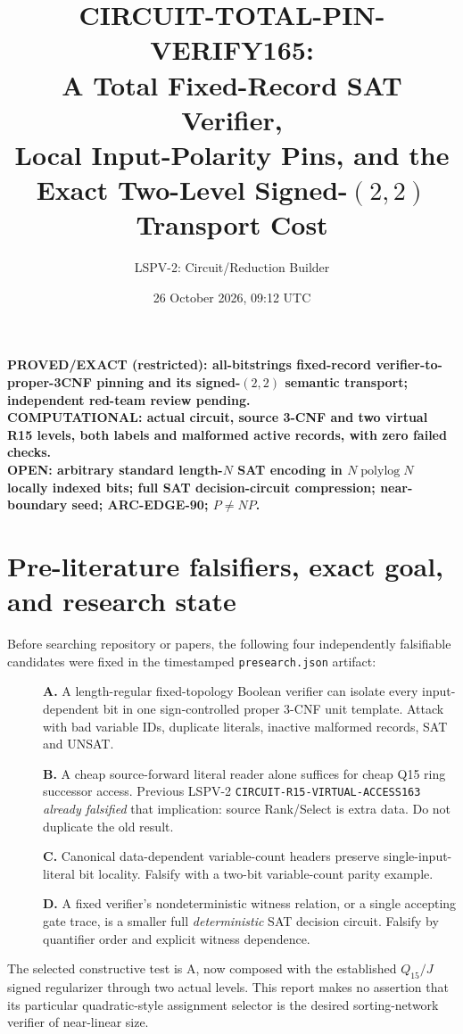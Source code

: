 \documentclass[11pt]{article}
\title{CIRCUIT-TOTAL-PIN-VERIFY165:\\A Total Fixed-Record SAT Verifier,\\Local Input-Polarity Pins, and the Exact Two-Level Signed-$(2,2)$ Transport Cost}
\author{LSPV-2: Circuit/Reduction Builder}
\date{26 October 2026, 09:12 UTC}
\begin{document}
\maketitle
\begin{center}
\textbf{PROVED/EXACT (restricted): all-bitstrings fixed-record verifier-to-proper-3CNF pinning and its signed-$(2,2)$ semantic transport; independent red-team review pending.}\\
\textbf{COMPUTATIONAL: actual circuit, source 3-CNF and two virtual R15 levels, both labels and malformed active records, with zero failed checks.}\\
\textbf{OPEN: arbitrary standard length-$N$ SAT encoding in $N\operatorname{polylog}N$ locally indexed bits; full SAT decision-circuit compression; near-boundary seed; ARC-EDGE-90; $P\neq NP$.}
\end{center}

\section{Pre-literature falsifiers, exact goal, and research state}
Before searching repository or papers, the following four independently falsifiable candidates were fixed in the timestamped \texttt{presearch.json} artifact:
\begin{description}
\item[] \textbf{A.} A length-regular fixed-topology Boolean verifier can isolate every input-dependent bit in one sign-controlled proper 3-CNF unit template. Attack with bad variable IDs, duplicate literals, inactive malformed records, SAT and UNSAT.
\item[] \textbf{B.} A cheap source-forward literal reader alone suffices for cheap Q15 ring successor access. Previous LSPV-2 \texttt{CIRCUIT-R15-VIRTUAL-ACCESS163} \emph{already falsified} that implication: source Rank/Select is extra data. Do not duplicate the old result.
\item[] \textbf{C.} Canonical data-dependent variable-count headers preserve single-input-literal bit locality. Falsify with a two-bit variable-count parity example.
\item[] \textbf{D.} A fixed verifier's nondeterministic witness relation, or a single accepting gate trace, is a smaller full \emph{deterministic} SAT decision circuit. Falsify by quantifier order and explicit witness dependence.
\end{description}
The selected constructive test is A, now composed with the established $Q_{15}/J$ signed regularizer through two actual levels. This report makes no assertion that its particular quadratic-style assignment selector is the desired sorting-network verifier of near-linear size.
\end{document}
